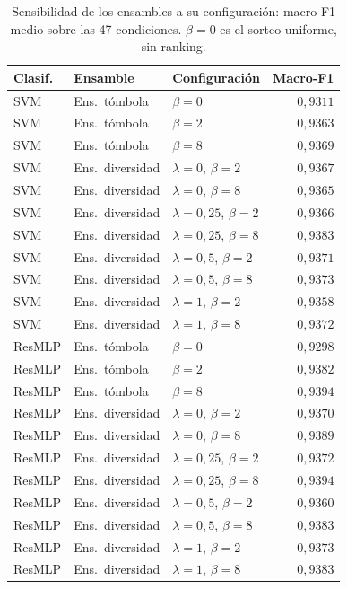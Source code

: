 \documentclass[11pt,a4paper]{article}
\begin{document}
\begin{table}[H]
\centering\fontsize{8}{10}\selectfont\setlength{\tabcolsep}{3.0pt}
\caption{Sensibilidad de los ensambles a su configuración: macro-F1 medio sobre las 47 condiciones. $\beta=0$ es el sorteo uniforme, sin ranking.}
\label{tab:sel-config}
\begin{tabular}{@{}lllr@{}}
\toprule
Clasif. & Ensamble & Configuración & Macro-F1 \\
\midrule
SVM & Ens.\ tómbola & $\beta=0$ & $0{,}9311$ \\
SVM & Ens.\ tómbola & $\beta=2$ & $0{,}9363$ \\
SVM & Ens.\ tómbola & $\beta=8$ & $0{,}9369$ \\
SVM & Ens.\ diversidad & $\lambda=0$, $\beta=2$ & $0{,}9367$ \\
SVM & Ens.\ diversidad & $\lambda=0$, $\beta=8$ & $0{,}9365$ \\
SVM & Ens.\ diversidad & $\lambda=0{,}25$, $\beta=2$ & $0{,}9366$ \\
SVM & Ens.\ diversidad & $\lambda=0{,}25$, $\beta=8$ & $0{,}9383$ \\
SVM & Ens.\ diversidad & $\lambda=0{,}5$, $\beta=2$ & $0{,}9371$ \\
SVM & Ens.\ diversidad & $\lambda=0{,}5$, $\beta=8$ & $0{,}9373$ \\
SVM & Ens.\ diversidad & $\lambda=1$, $\beta=2$ & $0{,}9358$ \\
SVM & Ens.\ diversidad & $\lambda=1$, $\beta=8$ & $0{,}9372$ \\
ResMLP & Ens.\ tómbola & $\beta=0$ & $0{,}9298$ \\
ResMLP & Ens.\ tómbola & $\beta=2$ & $0{,}9382$ \\
ResMLP & Ens.\ tómbola & $\beta=8$ & $0{,}9394$ \\
ResMLP & Ens.\ diversidad & $\lambda=0$, $\beta=2$ & $0{,}9370$ \\
ResMLP & Ens.\ diversidad & $\lambda=0$, $\beta=8$ & $0{,}9389$ \\
ResMLP & Ens.\ diversidad & $\lambda=0{,}25$, $\beta=2$ & $0{,}9372$ \\
ResMLP & Ens.\ diversidad & $\lambda=0{,}25$, $\beta=8$ & $0{,}9394$ \\
ResMLP & Ens.\ diversidad & $\lambda=0{,}5$, $\beta=2$ & $0{,}9360$ \\
ResMLP & Ens.\ diversidad & $\lambda=0{,}5$, $\beta=8$ & $0{,}9383$ \\
ResMLP & Ens.\ diversidad & $\lambda=1$, $\beta=2$ & $0{,}9373$ \\
ResMLP & Ens.\ diversidad & $\lambda=1$, $\beta=8$ & $0{,}9383$ \\
\bottomrule
\end{tabular}
\end{table}
\clearpage
\end{document}
